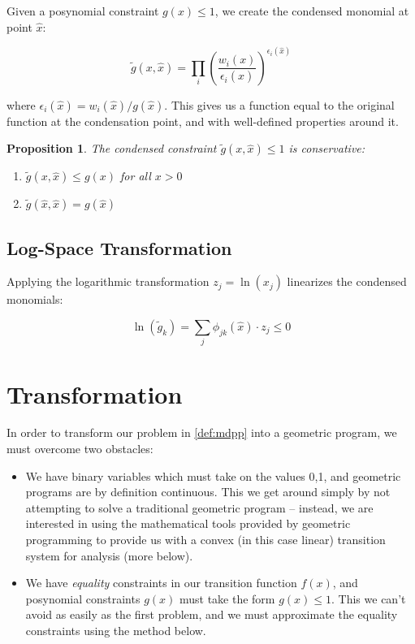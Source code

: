 \documentclass[11pt]{article}
\newtheorem{proposition}[theorem]{Proposition}
\begin{document}
Given a posynomial constraint $g(x) \leq 1$, we create the condensed monomial at point $\hat{x}$:

\begin{equation}
    \tilde{g}(x, \hat{x}) = \prod_{i} \left(\frac{w_i(x)}{\epsilon_i(\hat{x})}\right)^{\epsilon_i(\hat{x})}
\end{equation}

where $\epsilon_i(\hat{x}) = w_i(\hat{x})/g(\hat{x})$. This gives us a
function equal to the original function at the condensation point, and
with well-defined properties around it.

\begin{proposition}
The condensed constraint $\tilde{g}(x, \hat{x}) \leq 1$ is conservative:
\begin{enumerate}
    \item $\tilde{g}(x, \hat{x}) \leq g(x)$ for all $x > 0$
    \item $\tilde{g}(\hat{x}, \hat{x}) = g(\hat{x})$
\end{enumerate}
\end{proposition}

\subsection{Log-Space Transformation}

Applying the logarithmic transformation $z_j = \ln(x_j)$ linearizes
the condensed monomials:

\begin{equation}
    \ln(\tilde{g}_k) = \sum_j \phi_{jk}(\hat{x}) \cdot z_j \leq 0
\end{equation}

\section{Transformation}

In order to transform our problem in \autoref{def:mdpp} into a
geometric program, we must overcome two obstacles:

\begin{itemize}
\item We have binary variables which must take on the values 0,1, and
  geometric programs are by definition continuous. This we get around
  simply by not attempting to solve a traditional geometric program --
  instead, we are interested in using the mathematical tools provided
  by geometric programming to provide us with a convex (in this case
  linear) transition system for analysis (more below).

\item We have \emph{equality} constraints in our transition function
  $f(x)$, and posynomial constraints $g(x)$ must take the form
  $g(x) \leq 1$. This we can't avoid as easily as the first problem,
  and we must approximate the equality constraints using the method below.
\end{itemize}
\end{document}
